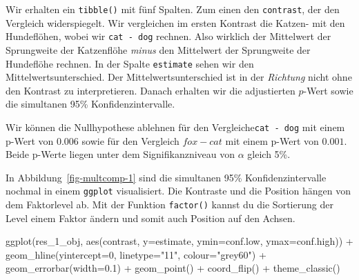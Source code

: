 \documentclass[
  letterpaper,
]{scrbook}
\newenvironment{Shaded}{\begin{snugshade}}{\end{snugshade}}
\newcommand{\AttributeTok}[1]{\textcolor[rgb]{0.40,0.45,0.13}{#1}}
\newcommand{\DecValTok}[1]{\textcolor[rgb]{0.68,0.00,0.00}{#1}}
\newcommand{\FloatTok}[1]{\textcolor[rgb]{0.68,0.00,0.00}{#1}}
\newcommand{\FunctionTok}[1]{\textcolor[rgb]{0.28,0.35,0.67}{#1}}
\newcommand{\NormalTok}[1]{\textcolor[rgb]{0.00,0.23,0.31}{#1}}
\newcommand{\SpecialCharTok}[1]{\textcolor[rgb]{0.37,0.37,0.37}{#1}}
\newcommand{\StringTok}[1]{\textcolor[rgb]{0.13,0.47,0.30}{#1}}
\begin{document}
Wir erhalten ein \texttt{tibble()} mit fünf Spalten. Zum einen den
\texttt{contrast}, der den Vergleich widerspiegelt. Wir vergleichen im
ersten Kontrast die Katzen- mit den Hundeflöhen, wobei wir
\texttt{cat\ -\ dog} rechnen. Also wirklich der Mittelwert der
Sprungweite der Katzenflöhe \emph{minus} den Mittelwert der Sprungweite
der Hundeflöhe rechnen. In der Spalte \texttt{estimate} sehen wir den
Mittelwertsunterschied. Der Mittelwertsunterschied ist in der
\emph{Richtung} nicht ohne den Kontrast zu interpretieren. Danach
erhalten wir die adjustierten \(p\)-Wert sowie die simultanen 95\%
Konfidenzintervalle.

Wir können die Nullhypothese ablehnen für den
Vergleiche\texttt{cat\ -\ dog} mit einem p-Wert von \(0.006\) sowie für
den Vergleich \(fox - cat\) mit einem p-Wert von \(0.001\). Beide
p-Werte liegen unter dem Signifikanzniveau von \(\alpha\) gleich 5\%.

In Abbildung~\ref{fig-multcomp-1} sind die simultanen 95\%
Konfidenzintervalle nochmal in einem \texttt{ggplot} visualisiert. Die
Kontraste und die Position hängen von dem Faktorlevel ab. Mit der
Funktion \texttt{factor()} kannst du die Sortierung der Level einem
Faktor ändern und somit auch Position auf den Achsen.

\begin{Shaded}
\begin{Highlighting}[]
  \FunctionTok{ggplot}\NormalTok{(res\_1\_obj, }\FunctionTok{aes}\NormalTok{(contrast, }\AttributeTok{y=}\NormalTok{estimate, }
                        \AttributeTok{ymin=}\NormalTok{conf.low, }\AttributeTok{ymax=}\NormalTok{conf.high)) }\SpecialCharTok{+}
    \FunctionTok{geom\_hline}\NormalTok{(}\AttributeTok{yintercept=}\DecValTok{0}\NormalTok{, }\AttributeTok{linetype=}\StringTok{"11"}\NormalTok{, }\AttributeTok{colour=}\StringTok{"grey60"}\NormalTok{) }\SpecialCharTok{+}
    \FunctionTok{geom\_errorbar}\NormalTok{(}\AttributeTok{width=}\FloatTok{0.1}\NormalTok{) }\SpecialCharTok{+} 
    \FunctionTok{geom\_point}\NormalTok{() }\SpecialCharTok{+}
    \FunctionTok{coord\_flip}\NormalTok{() }\SpecialCharTok{+}
    \FunctionTok{theme\_classic}\NormalTok{()}
\end{Highlighting}
\end{Shaded}
\end{document}
